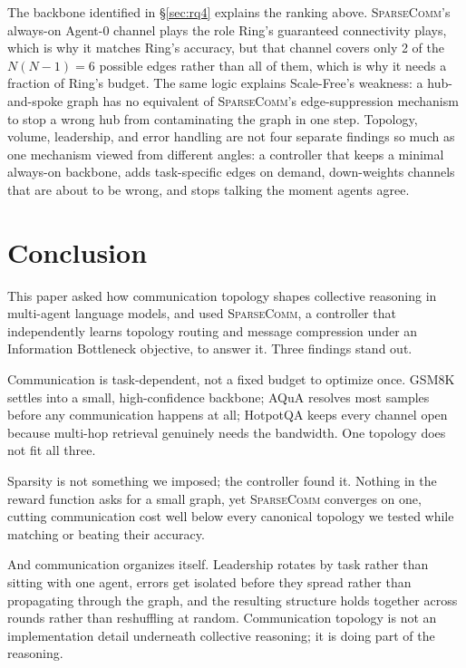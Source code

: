 \documentclass[11pt]{article}
\newcommand{\sys}{\textsc{SparseComm}\xspace}
\begin{document}
The backbone identified in \S\ref{sec:rq4} explains the ranking above.
\sys's always-on Agent-0 channel plays the role Ring's guaranteed
connectivity plays, which is why it matches Ring's accuracy, but that
channel covers only 2 of the $N(N-1)=6$ possible edges rather than all of
them, which is why it needs a fraction of Ring's budget. The same logic
explains Scale-Free's weakness: a hub-and-spoke graph has no equivalent of
\sys's edge-suppression mechanism to stop a wrong hub from contaminating
the graph in one step. Topology, volume, leadership, and error handling are
not four separate findings so much as one mechanism viewed from different
angles: a controller that keeps a minimal always-on backbone, adds
task-specific edges on demand, down-weights channels that are about to be
wrong, and stops talking the moment agents agree.
\section{Conclusion}
\label{sec:conclusion}

This paper asked how communication topology shapes collective reasoning in
multi-agent language models, and used \sys, a controller that independently
learns topology routing and message compression under an Information
Bottleneck objective, to answer it. Three findings stand out.

Communication is task-dependent, not a fixed budget to optimize once.
GSM8K settles into a small, high-confidence backbone; AQuA resolves most
samples before any communication happens at all; HotpotQA keeps every
channel open because multi-hop retrieval genuinely needs the bandwidth. One
topology does not fit all three.

Sparsity is not something we imposed; the controller found it. Nothing in
the reward function asks for a small graph, yet \sys converges on one,
cutting communication cost well below every canonical topology we tested
while matching or beating their accuracy.

And communication organizes itself. Leadership rotates by task rather than
sitting with one agent, errors get isolated before they spread rather than
propagating through the graph, and the resulting structure holds together
across rounds rather than reshuffling at random. Communication topology is
not an implementation detail underneath collective reasoning; it is doing
part of the reasoning.

\end{document}
